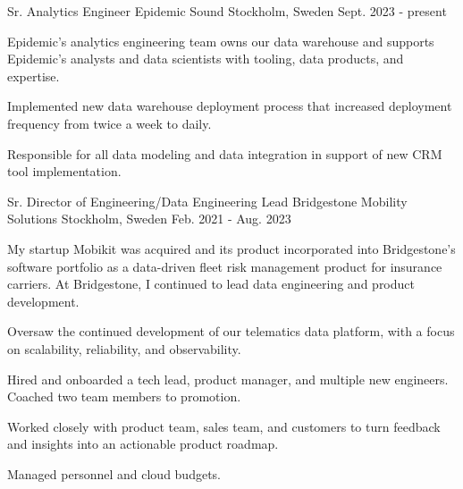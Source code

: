

\begin{cventries}

  \cventry
    {Sr. Analytics Engineer} %
    {Epidemic Sound} %
    {Stockholm, Sweden} %
    {Sept. 2023 - present} %
    {
    Epidemic's analytics engineering team owns our data warehouse and supports Epidemic's analysts
    and data scientists with tooling, data products, and expertise.
    \vspace{5.0mm}
      \begin{cvitems} %
        \item {Implemented new data warehouse deployment process that increased deployment frequency from twice a week to daily.}
        \item {Responsible for all data modeling and data integration in support of new CRM tool implementation.}
      \end{cvitems}
    }

  \cventry
    {Sr. Director of Engineering/Data Engineering Lead} %
    {Bridgestone Mobility Solutions} %
    {Stockholm, Sweden} %
    {Feb. 2021 - Aug. 2023} %
    {
    My startup Mobikit was acquired and its product incorporated into Bridgestone's software portfolio as a data-driven fleet risk management product for insurance carriers. At Bridgestone, I continued to lead data engineering and product development.
    \vspace{5.0mm}
      \begin{cvitems} %
        \item {Oversaw the continued development of our telematics data platform, with a focus on scalability, reliability, and observability.}
        \item {Hired and onboarded a tech lead, product manager, and multiple new engineers. Coached two team members to promotion.}
        \item {Worked closely with product team, sales team, and customers to turn feedback and insights into an actionable product roadmap.}
        \item {Managed personnel and cloud budgets.}
      \end{cvitems}
    }


\end{cventries}
